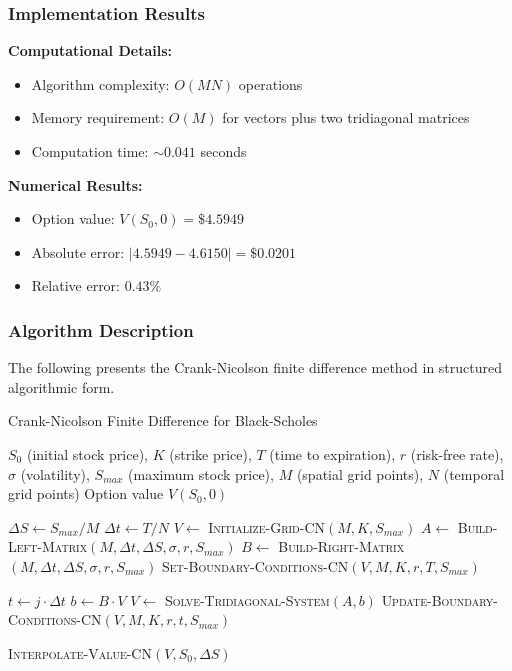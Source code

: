 \documentclass[12pt,a4paper]{article}
\numberwithin{algorithm}{subsection}
\begin{document}
\subsubsection{Implementation Results}

\textbf{Computational Details:}
\begin{itemize}
\item Algorithm complexity: $O(MN)$ operations
\item Memory requirement: $O(M)$ for vectors plus two tridiagonal matrices
\item Computation time: $\sim 0.041$ seconds
\end{itemize}

\textbf{Numerical Results:}
\begin{itemize}
\item Option value: $V(S_0, 0) = \$4.5949$
\item Absolute error: $|4.5949 - 4.6150| = \$0.0201$
\item Relative error: $0.43\%$
\end{itemize}

\subsubsection{Algorithm Description}

The following presents the Crank-Nicolson finite difference method in structured algorithmic form.

\begin{algorithm}[H]
\caption{Crank-Nicolson Finite Difference for Black-Scholes}
\begin{algorithmic}[1]
\REQUIRE $S_0$ (initial stock price), $K$ (strike price), $T$ (time to expiration), $r$ (risk-free rate), $\sigma$ (volatility), $S_{max}$ (maximum stock price), $M$ (spatial grid points), $N$ (temporal grid points)
\ENSURE Option value $V(S_0, 0)$

\STATE $\Delta S \leftarrow S_{max} / M$
\STATE $\Delta t \leftarrow T / N$
\STATE $V \leftarrow$ \textsc{Initialize-Grid-CN}$(M, K, S_{max})$
\STATE $A \leftarrow$ \textsc{Build-Left-Matrix}$(M, \Delta t, \Delta S, \sigma, r, S_{max})$
\STATE $B \leftarrow$ \textsc{Build-Right-Matrix}$(M, \Delta t, \Delta S, \sigma, r, S_{max})$
\STATE \textsc{Set-Boundary-Conditions-CN}$(V, M, K, r, T, S_{max})$

    \STATE $t \leftarrow j \cdot \Delta t$
    \STATE $b \leftarrow B \cdot V$ 
    \STATE $V \leftarrow$ \textsc{Solve-Tridiagonal-System}$(A, b)$
    \STATE \textsc{Update-Boundary-Conditions-CN}$(V, M, K, r, t, S_{max})$
\ENDFOR

\RETURN \textsc{Interpolate-Value-CN}$(V, S_0, \Delta S)$
\end{algorithmic}
\end{algorithm}
\end{document}
